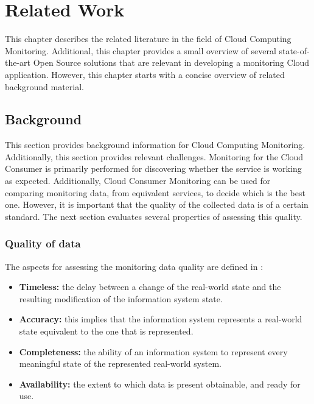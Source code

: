 \chapter{Related Work}\label{ch:related_work}
This chapter describes the related literature in the field of Cloud Computing Monitoring. Additional, this chapter provides a small overview of several state-of-the-art Open Source solutions that are relevant in developing a monitoring Cloud application. However, this chapter starts with a concise overview of related background material.

\section{Background} \label{sec:background}
This section provides background information for Cloud Computing Monitoring. Additionally, this section provides relevant challenges. Monitoring for the Cloud Consumer is primarily performed for discovering whether the service is working as expected. Additionally, Cloud Consumer Monitoring can be used for comparing monitoring data, from equivalent services, to decide which is the best one. However, it is important that the quality of the collected data is of a certain standard. The next section evaluates several properties of assessing this quality.

\subsection{Quality of data} \label{sec:quality}
The aspects for assessing the monitoring data quality are defined in \cite{wand1996anchoring}:
\begin{itemize}
    \item \textbf{Timeless: }the delay between a change of the real-world state and the resulting modification of the information system state.
    \item \textbf{Accuracy: }this implies that the information system represents a real-world state equivalent to the one that is represented.
    \item \textbf{Completeness: }the ability of an information system to represent every meaningful state of the represented real-world system.
    \item \textbf{Availability: }the extent to which data is present obtainable, and ready for use.
\end{itemize}


